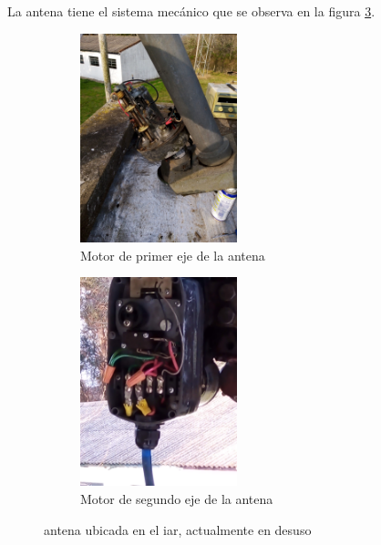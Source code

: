 La antena tiene el sistema mecánico que se observa en la figura \ref{fig_mec_ant}. 
\begin{figure}[ht]
	\begin{subfigure}{0.5\textwidth}
		\centering
		\includegraphics[width=0.5\textwidth]{parte_1/cap1/mot1}
		\caption{Motor de primer eje de la antena }
		\label{fig_mec_ant1}		
	\end{subfigure}
	\hfill 
	\begin{subfigure}{0.5\textwidth}
		\centering
		\includegraphics[width=0.5\textwidth]{parte_1/cap1/mot2}
		\caption{Motor de segundo eje de la antena }
		\label{fig_mec_ant2}
	\end{subfigure}
	
	\caption{antena ubicada en el iar, actualmente en desuso}
	\label{fig_mec_ant}
\end{figure}


